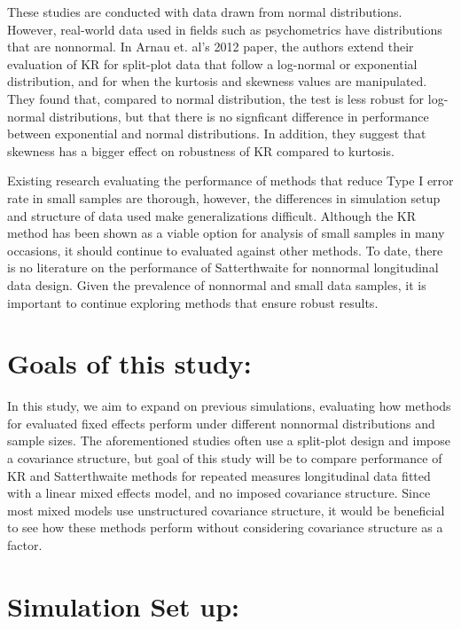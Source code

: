 \documentclass[12pt, twoside]{amherstthesis}
\begin{document}
These studies are conducted with data drawn from normal distributions. However, real-world data used in fields such as psychometrics have distributions that are nonnormal. In Arnau et. al's 2012 paper, the authors extend their evaluation of KR for split-plot data that follow a log-normal or exponential distribution, and for when the kurtosis and skewness values are manipulated. They found that, compared to normal distribution, the test is less robust for log-normal distributions, but that there is no signficant difference in performance between exponential and normal distributions. In addition, they suggest that skewness has a bigger effect on robustness of KR compared to kurtosis.

Existing research evaluating the performance of methods that reduce Type I error rate in small samples are thorough, however, the differences in simulation setup and structure of data used make generalizations difficult. Although the KR method has been shown as a viable option for analysis of small samples in many occasions, it should continue to evaluated against other methods. To date, there is no literature on the performance of Satterthwaite for nonnormal longitudinal data design. Given the prevalence of nonnormal and small data samples, it is important to continue exploring methods that ensure robust results.

\hypertarget{goals-of-this-study}{%
\section{Goals of this study:}\label{goals-of-this-study}}

In this study, we aim to expand on previous simulations, evaluating how methods for evaluated fixed effects perform under different nonnormal distributions and sample sizes. The aforementioned studies often use a split-plot design and impose a covariance structure, but goal of this study will be to compare performance of KR and Satterthwaite methods for repeated measures longitudinal data fitted with a linear mixed effects model, and no imposed covariance structure. Since most mixed models use unstructured covariance structure, it would be beneficial to see how these methods perform without considering covariance structure as a factor.

\hypertarget{simulation-set-up}{%
\section{Simulation Set up:}\label{simulation-set-up}}
\end{document}
